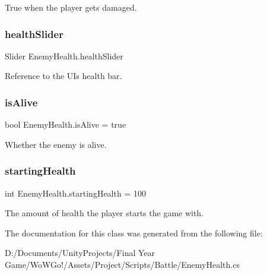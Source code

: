 True when the player gets damaged. 

\mbox{\label{class_enemy_health_a4b880bdd617c88f258fc302bafd3dff9}} 
\subsubsection{\texorpdfstring{healthSlider}{healthSlider}}
{\footnotesize\ttfamily Slider Enemy\+Health.\+health\+Slider}



Reference to the UI\textquotesingle{}s health bar. 

\mbox{\label{class_enemy_health_a45d17a7737377529a53d884743688afc}} 
\subsubsection{\texorpdfstring{isAlive}{isAlive}}
{\footnotesize\ttfamily bool Enemy\+Health.\+is\+Alive = true\hspace{0.3cm}{\ttfamily [private]}}



Whether the enemy is alive. 

\mbox{\label{class_enemy_health_a38679a6db9f4c1a03512494520bd7016}} 
\subsubsection{\texorpdfstring{startingHealth}{startingHealth}}
{\footnotesize\ttfamily int Enemy\+Health.\+starting\+Health = 100}



The amount of health the player starts the game with. 



The documentation for this class was generated from the following file\+:\begin{DoxyCompactItemize}
\item 
D\+:/\+Documents/\+Unity\+Projects/\+Final Year Game/\+Wo\+W\+Go!/\+Assets/\+Project/\+Scripts/\+Battle/Enemy\+Health.\+cs\end{DoxyCompactItemize}

